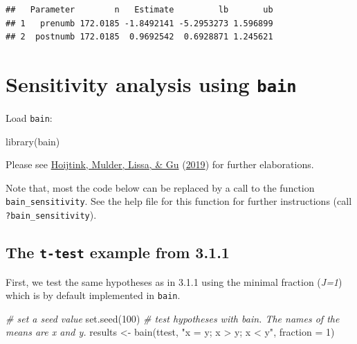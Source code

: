 \documentclass[
]{book}
\newenvironment{Shaded}{\begin{snugshade}}{\end{snugshade}}
\newcommand{\AttributeTok}[1]{\textcolor[rgb]{0.77,0.63,0.00}{#1}}
\newcommand{\CommentTok}[1]{\textcolor[rgb]{0.56,0.35,0.01}{\textit{#1}}}
\newcommand{\DecValTok}[1]{\textcolor[rgb]{0.00,0.00,0.81}{#1}}
\newcommand{\FunctionTok}[1]{\textcolor[rgb]{0.00,0.00,0.00}{#1}}
\newcommand{\NormalTok}[1]{#1}
\newcommand{\OtherTok}[1]{\textcolor[rgb]{0.56,0.35,0.01}{#1}}
\newcommand{\StringTok}[1]{\textcolor[rgb]{0.31,0.60,0.02}{#1}}
\begin{document}
\begin{verbatim}
##   Parameter        n   Estimate         lb       ub
## 1   prenumb 172.0185 -1.8492141 -5.2953273 1.596899
## 2  postnumb 172.0185  0.9692542  0.6928871 1.245621
\end{verbatim}

\hypertarget{sensitivity-analysis-using-bain}{%
\chapter{\texorpdfstring{Sensitivity analysis using \texttt{bain}}{Sensitivity analysis using bain}}\label{sensitivity-analysis-using-bain}}

Load \texttt{bain}:

\begin{Shaded}
\begin{Highlighting}[]
\FunctionTok{library}\NormalTok{(bain)}
\end{Highlighting}
\end{Shaded}

Please see \protect\hyperlink{ref-hoijtink2019tutorial}{Hoijtink, Mulder, Lissa, \& Gu} (\protect\hyperlink{ref-hoijtink2019tutorial}{2019}) for further elaborations.

Note that, most the code below can be replaced by a call to the function \texttt{bain\_sensitivity}. See the help file for this function for further instructions (call \texttt{?bain\_sensitivity}).

\hypertarget{the-t-test-example-from-3.1.1}{%
\section{\texorpdfstring{The \texttt{t-test} example from 3.1.1}{The t-test example from 3.1.1}}\label{the-t-test-example-from-3.1.1}}

First, we test the same hypotheses as in 3.1.1 using the minimal fraction (\emph{J=1}) which is by default implemented in \texttt{bain}.

\begin{Shaded}
\begin{Highlighting}[]
\CommentTok{\# set a seed value}
\FunctionTok{set.seed}\NormalTok{(}\DecValTok{100}\NormalTok{)}
\CommentTok{\# test hypotheses with bain. The names of the means are x and y.}
\NormalTok{results }\OtherTok{\textless{}{-}} \FunctionTok{bain}\NormalTok{(ttest, }\StringTok{"x = y; x \textgreater{} y; x \textless{} y"}\NormalTok{, }\AttributeTok{fraction =} \DecValTok{1}\NormalTok{)}
\end{Highlighting}
\end{Shaded}
\end{document}
